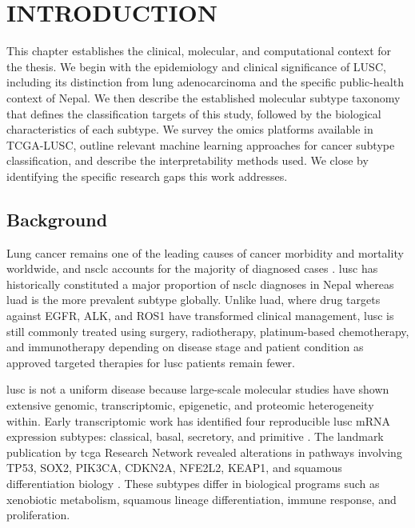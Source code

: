 \chapter{INTRODUCTION}

This chapter establishes the clinical, molecular, and computational context for the thesis. We begin with the epidemiology and clinical significance of LUSC, including its distinction from lung adenocarcinoma and the specific public-health context of Nepal. We then describe the established molecular subtype taxonomy that defines the classification targets of this study, followed by the biological characteristics of each subtype. We survey the omics platforms available in TCGA-LUSC, outline relevant machine learning approaches for cancer subtype classification, and describe the interpretability methods used. We close by identifying the specific research gaps this work addresses.  	

\section{Background}

Lung cancer remains one of the leading causes of cancer morbidity and mortality worldwide, and \gls{nsclc} accounts for the majority of diagnosed cases \parencite{Sung2021,Herbst2018}. \gls{lusc} has historically constituted a major proportion of \gls{nsclc} diagnoses in Nepal whereas \gls{luad} is the more prevalent subtype globally. Unlike \gls{luad}, where drug targets against EGFR, ALK, and ROS1 have transformed clinical management, \gls{lusc} is still commonly treated using surgery, radiotherapy, platinum-based chemotherapy, and immunotherapy depending on disease stage and patient condition \parencite{Herbst2018,Lau2022-hy} as approved targeted therapies for \gls{lusc} patients remain fewer.

\gls{lusc} is not a uniform disease because large-scale molecular studies have shown extensive genomic, transcriptomic, epigenetic, and proteomic heterogeneity within. Early transcriptomic work has identified four reproducible \gls{lusc} mRNA expression subtypes: classical, basal, secretory, and primitive \parencite{Wilkerson2010}. The landmark publication by \gls{tcga} Research Network revealed alterations in pathways involving TP53, SOX2, PIK3CA, CDKN2A, NFE2L2, KEAP1, and squamous differentiation biology \parencite{Hammerman2012}. These subtypes differ in biological programs such as xenobiotic metabolism, squamous lineage differentiation, immune response, and proliferation.


